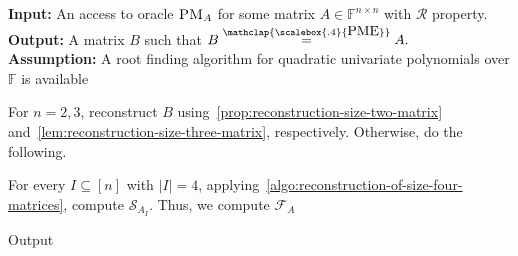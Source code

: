\documentclass[11pt,letterpaper]{article}
\newcommand{\F}{\mathbb{F}}
\DeclareMathOperator*{\RWC}{\textsc{RECONSTRUCT-WITHOUT-CUT}}
\newcommand{\PME}{\stackrel{\mathclap{\scalebox{.4}{\mbox{PME}}}}{=}}
\newcommand{\prop}{\mathcal{R}}
\newcommand{\PMoracle}[1]{\textsc{PM}_{#1}}
\newcommand{\submatrixfamily}[1]{\mathcal{F}_{#1}}
\newcommand{\fourPMEfamily}[1]{\mathcal{S}_{#1}}
\begin{document}
{{{%

\begin{algorithm}[H]
\caption{Reconstruction of matrices with  property $\prop$}
\label{algo:reconstruction-with-Q}
\textbf{Input:} An access to oracle $\PMoracle{A}$ for some matrix $A\in\F^{n\times n}$ with $\prop$ property.\\
\textbf{Output:} A matrix $B$ such that $B\PME A.$\\
\textbf{Assumption:} A root finding algorithm for quadratic univariate polynomials over $\F$ is available
\begin{algorithmic}[1]
\item For $n=2,3$, reconstruct $B$ using~\cref{prop:reconstruction-size-two-matrix} and~\cref{lem:reconstruction-size-three-matrix}, respectively. Otherwise, do the following.

\State For every $I\subseteq [n]$ with $|I|=4$, applying~\cref{algo:reconstruction-of-size-four-matrices}, compute $\fourPMEfamily{A_I}$. Thus, we compute $\submatrixfamily{A}$\label{algo:reconstruction-with-Q-family-construction}

\State Output \label{algo:reconstruction-with-Q-function-call}


\end{algorithmic}
\end{algorithm}}}}
\end{document}
